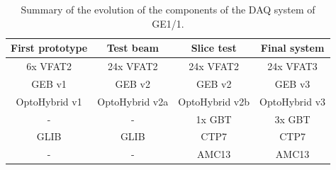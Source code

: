     \begin{table}[h!]
      \begin{tabularx}{\textwidth}{C{1}C{1}C{1}C{1}}
        \textbf{First prototype} & \textbf{Test beam}   & \textbf{Slice test}  & \textbf{Final system} \\ \hline
        6x VFAT2        & 24x VFAT2       & 24x VFAT2       & 24x VFAT3 \\
        GEB v1          & GEB v2          & GEB v2          & GEB v3 \\
        OptoHybrid v1   & OptoHybrid v2a  & OptoHybrid v2b  & OptoHybrid v3 \\
        -               & -               & 1x GBT          & 3x GBT \\
        GLIB            & GLIB            & CTP7            & CTP7 \\
        -               & -               & AMC13           & AMC13 \\
      \end{tabularx}
      \caption{Summary of the evolution of the components of the DAQ system of GE1/1.}
      \label{tab:II-2-summary}
    \end{table}
